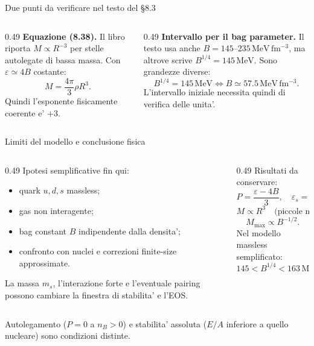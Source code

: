 \begin{frame}{Due punti da verificare nel testo del \S8.3}
\footnotesize
\begin{columns}[T,onlytextwidth]
\begin{column}{0.49\textwidth}
\textbf{Equazione (8.38).}
\medskip
Il libro riporta $M\propto R^{-3}$ per
stelle autolegate di bassa massa.
\medskip
Con $\varepsilon\simeq4B$ costante:
\[
M=\frac{4\pi}{3}\rho R^3.
\]
Quindi l'esponente fisicamente
coerente e' $+3$.
\end{column}
\begin{column}{0.49\textwidth}
\textbf{Intervallo per il bag parameter.}
\medskip
Il testo usa anche $B=145$--$235\,
\mathrm{MeV\,fm^{-3}}$, ma altrove
scrive $B^{1/4}=145\,\mathrm{MeV}$.
\medskip
Sono grandezze diverse:
\[
B^{1/4}=145\,\mathrm{MeV}
\Longleftrightarrow
B\simeq57.5\,\mathrm{MeV\,fm^{-3}}.
\]
L'intervallo iniziale necessita
quindi di verifica delle unita'.
\end{column}
\end{columns}
\end{frame}

\begin{frame}{Limiti del modello e conclusione fisica}
\small
\begin{columns}[T,onlytextwidth]
\begin{column}{0.49\textwidth}
Ipotesi semplificative fin qui:
\begin{itemize}
\item quark $u,d,s$ massless;
\item gas non interagente;
\item bag constant $B$ indipendente
 dalla densita';
\item confronto con nuclei e correzioni
 finite-size approssimate.
\end{itemize}
La massa $m_s$, l'interazione forte e
l'eventuale pairing possono cambiare
la finestra di stabilita' e l'EOS.
\end{column}
\begin{column}{0.49\textwidth}
Risultati da conservare:
\[
P=\frac{\varepsilon-4B}{3},
\quad \varepsilon_s=4B,
\]
\[
M\propto R^3\quad\text{(piccole masse)},
\]
\[
M_{\max}\propto B^{-1/2}.
\]
Nel modello massless semplificato:
\[
145<B^{1/4}<163\,\mathrm{MeV}.
\]
\end{column}
\end{columns}
\medskip
Autolegamento ($P=0$ a $n_B>0$) e stabilita' assoluta
($E/A$ inferiore a quello nucleare) sono condizioni distinte.
\end{frame}

